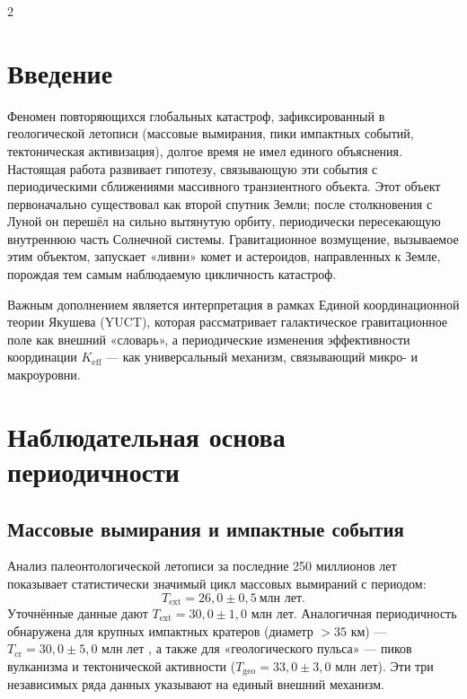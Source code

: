 \documentclass[11pt,a4paper]{article}
\begin{document}
	\begin{multicols}{2}
		
		\section{Введение}
		
		Феномен повторяющихся глобальных катастроф, зафиксированный в геологической летописи (массовые вымирания, пики импактных событий, тектоническая активизация), долгое время не имел единого объяснения. Настоящая работа развивает гипотезу, связывающую эти события с периодическими сближениями массивного транзиентного объекта. Этот объект первоначально существовал как второй спутник Земли; после столкновения с Луной он перешёл на сильно вытянутую орбиту, периодически пересекающую внутреннюю часть Солнечной системы. Гравитационное возмущение, вызываемое этим объектом, запускает «ливни» комет и астероидов, направленных к Земле, порождая тем самым наблюдаемую цикличность катастроф.
		
		Важным дополнением является интерпретация в рамках Единой координационной теории Якушева (YUCT), которая рассматривает галактическое гравитационное поле как внешний «словарь», а периодические изменения эффективности координации \(K_{\mathrm{eff}}\) — как универсальный механизм, связывающий микро- и макроуровни.
		
		\section{Наблюдательная основа периодичности}
		
		\subsection{Массовые вымирания и импактные события}
		
		Анализ палеонтологической летописи за последние 250 миллионов лет \cite{Raup1984, Melott2010} показывает статистически значимый цикл массовых вымираний с периодом:
		\[
		T_{\text{ext}} = 26,0 \pm 0,5\ \text{млн лет}.
		\]
		Уточнённые данные дают \(T_{\text{ext}} = 30,0 \pm 1,0\) млн лет. Аналогичная периодичность обнаружена для крупных импактных кратеров (диаметр \(>35\) км) — \(T_{\text{cr}} = 30,0 \pm 5,0\) млн лет \cite{RampinoStothers1984}, а также для «геологического пульса» — пиков вулканизма и тектонической активности (\(T_{\text{geo}} = 33,0 \pm 3,0\) млн лет). Эти три независимых ряда данных указывают на единый внешний механизм.
		

\end{multicols}
\end{document}
